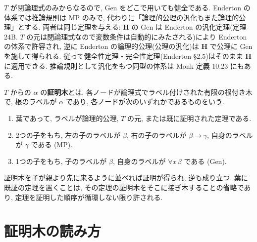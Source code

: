\begin{rem}
  $T$ が閉論理式のみからなるので, Gen をどこで用いても健全である. Enderton の体系では推論規則は MP のみで, 代わりに「論理的公理の汎化もまた論理的公理」とする. 両者は同じ定理を与える: $\mathbf{H}$ の Gen は Enderton の汎化定理(定理 24B. $T$ の元は閉論理式なので変数条件は自動的にみたされる)により Enderton の体系で許容され, 逆に Enderton の論理的公理(公理の汎化)は $\mathbf{H}$ で公理に Gen を施して得られる. 従って健全性定理・完全性定理(Enderton \S 2.5)はそのまま $\mathbf{H}$ に適用できる. 推論規則として汎化をもつ同型の体系は Monk \cite{monk} 定義 10.23 にもある.
\end{rem}

\begin{dfn}[証明木]\label{dfn:prooftree}
  $T$ からの $\alpha$ の\textbf{証明木}とは, 各ノードが論理式でラベル付けされた有限の根付き木で, 根のラベルが $\alpha$ であり, 各ノードが次のいずれかであるものをいう.
  \begin{enumerate}[label=(\arabic*)]
    \item 葉であって, ラベルが論理的公理, $T$ の元, または既に証明された定理である.
    \item 2つの子をもち, 左の子のラベルが $\beta$, 右の子のラベルが $\beta \to \gamma$, 自身のラベルが $\gamma$ である (MP).
    \item 1つの子をもち, 子のラベルが $\beta$, 自身のラベルが $\forall x\,\beta$ である (Gen).
  \end{enumerate}
\end{dfn}

証明木を子が親より先に来るように並べれば証明が得られ, 逆も成り立つ. 葉に既証の定理を置くことは, その定理の証明木をそこに接ぎ木することの省略であり, 定理を証明した順序が循環しない限り許される.

\section{証明木の読み方}\label{sec:reading}

